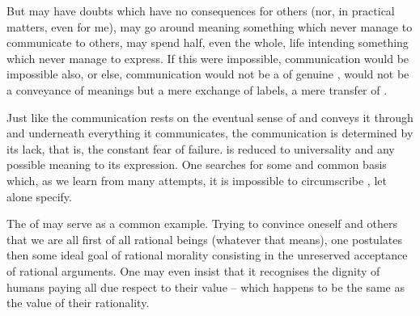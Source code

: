But  may have doubts which have no consequences for others (nor, in
practical matters, even for me),  may go around meaning something which
 never manage to communicate to others,  may spend half, even the
whole, life intending something which  never manage to express. If this
were impossible, communication would be impossible also, or else, communication
would not be a  of genuine , would not be a
conveyance of meanings but a mere exchange of labels, a mere transfer of
.

\pa Just like the  communication rests on the eventual
sense of  and conveys it through and underneath everything it
 communicates, the  communication is determined by
its lack, that is, the constant fear of failure.  is reduced to
universality and any possible meaning to its  expression. One
searches for some  and common basis which, as we learn from many
attempts, it is impossible to circumscribe  , let alone
 specify. 

The  of  may serve as a common
example. Trying to convince oneself and others that we are
all first of all rational beings (whatever that means), one postulates then some
ideal goal of rational morality consisting in the unreserved acceptance of
rational arguments. One may even insist that it recognises the dignity of humans
paying all due respect to their value -- which happens to be the same as the
value of their rationality.

